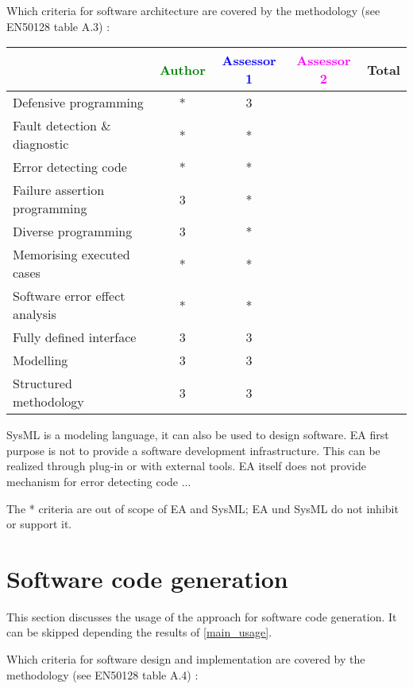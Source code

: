 Which criteria for software architecture are covered by the methodology
(see EN50128 table A.3) :

\begin{tabular}{|l | c | c | c | c|}
\hline
& \textcolor{green}{Author} & \textcolor{blue}{Assessor 1} & \textcolor{magenta}{Assessor 2} & Total \\
\hline
Defensive programming  &* & 3 & &  \\
\hline 
Fault detection \& diagnostic  &* & *& &  \\
\hline
Error detecting code  &* & *& &  \\
\hline
Failure assertion programming &3 & *& &  \\
\hline
Diverse programming &3 & *& &  \\
\hline
Memorising executed cases &* & *& &  \\
\hline
Software error effect analysis &* & *& &  \\
\hline
Fully defined interface &3 & 3 & &  \\
\hline
Modelling  &3 & 3& &  \\
\hline
Structured methodology &3 & 3& &  \\
\hline
\end{tabular}
\begin{author_comment}
SysML is a modeling language, it can also be used to design
software. EA first purpose is not to provide a software development
infrastructure. This can be realized through plug-in or with external
tools.
EA itself does not provide mechanism for error detecting code ...
\end{author_comment}

\begin{assessor1}
The * criteria are out of scope of EA and SysML; EA und SysML do not inhibit or support it.
\end{assessor1}

\section{Software code generation}
This section discusses the usage of the approach for software code generation.
It can be skipped depending the results of \ref{main_usage}.

Which criteria for software design and implementation are covered by the methodology
(see EN50128 table A.4) :


